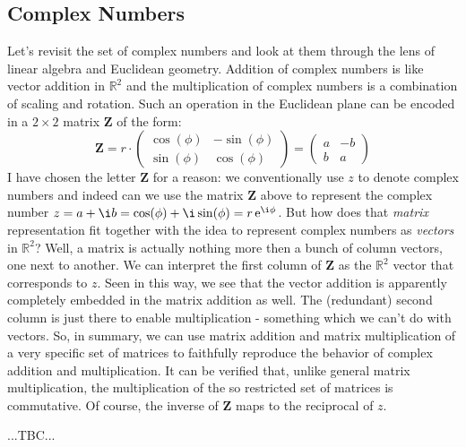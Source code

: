 \subsection{Complex Numbers}
Let's revisit the set of complex numbers and look at them through the lens of linear algebra and Euclidean geometry. Addition of complex numbers is like vector addition in $\mathbb{R}^2$ and the multiplication of complex numbers is a combination of scaling and rotation. Such an operation in the Euclidean plane can be encoded in a $2 \times 2$ matrix $\mathbf{Z}$ of the form:
\begin{equation}
 \mathbf{Z} 
 = r \cdot
 \begin{pmatrix}
 \cos(\phi) & -\sin(\phi) \\
 \sin(\phi) &  \cos(\phi)
 \end{pmatrix}
 =
 \begin{pmatrix}
  a & -b \\
 b  &  a
 \end{pmatrix} 
\end{equation}
I have chosen the letter $\mathbf{Z}$ for a reason: we conventionally use $z$ to denote complex numbers and indeed can we use the matrix $\mathbf{Z}$ above to represent the complex number $z = a + \i b = \cos(\phi) + \i \sin(\phi) = r \e^{\i \phi}$. But how does that \emph{matrix} representation fit together with the idea to represent complex numbers as \emph{vectors} in $\mathbb{R}^2$? Well, a matrix is actually nothing more then a bunch of column vectors, one next to another. We can interpret the first column of $\mathbf{Z}$ as the $\mathbb{R}^2$ vector that corresponds to $z$. Seen in this way, we see that the vector addition is apparently completely embedded in the matrix addition as well. The (redundant) second column is just there to enable multiplication - something which we can't do with vectors. So, in summary, we can use matrix addition and matrix multiplication of a very specific set of matrices to faithfully reproduce the behavior of complex addition and multiplication. It can be verified that, unlike general matrix multiplication, the multiplication of the so restricted set of matrices is commutative. Of course, the inverse of $\mathbf{Z}$ maps to the reciprocal of $z$.

...TBC...




